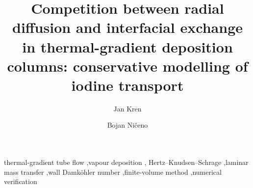 \documentclass[preprint,12pt]{elsarticle}
\begin{document}
\onehalfspacing

\begin{frontmatter}
\title{Competition between radial diffusion and interfacial exchange in
thermal-gradient deposition columns: conservative modelling of iodine
transport}

\author[psi]{Jan Kren}
\author[psi]{Bojan Ni\v{c}eno}

\begin{abstract}

\end{abstract}

\begin{keyword}
thermal-gradient tube flow \sep vapour deposition \sep
Hertz--Knudsen--Schrage \sep laminar mass transfer \sep wall
Damk\"ohler number \sep finite-volume method \sep numerical verification
\end{keyword}
\end{frontmatter}

\linenumbers

















\end{document}
